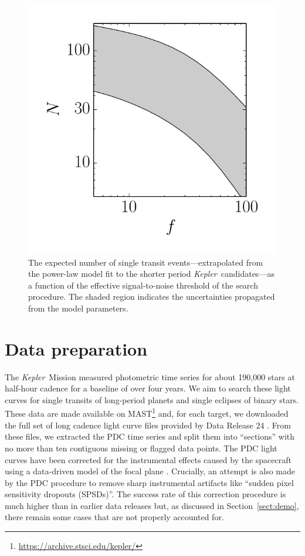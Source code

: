 \documentclass[12pt,preprint]{aastex}
\newcommand{\project}[1]{\textsl{#1}}
\newcommand{\kepler}{\project{Kepler}}
\newcommand{\figlabel}[1]{\label{fig:#1}}
\newcommand{\sectionname}{Section}
\newcommand{\sectref}[1]{\ref{sect:#1}}
\newcommand{\Sect}[1]{\sectionname~\sectref{#1}}
\newcommand{\sect}[1]{\Sect{#1}}
\newcommand{\sectlabel}[1]{\label{sect:#1}}
\begin{document}
\begin{figure}[p]
\begin{center}
\includegraphics{figures/predict.pdf}
\end{center}
\caption{%
The expected number of single transit events---extrapolated from the
\citet{Dong:2013} power-law model fit to the shorter period \kepler\
candidates---as a function of the effective signal-to-noise threshold of the
search procedure.
The shaded region indicates the uncertainties propagated from the model
parameters.
\figlabel{predict}}
\end{figure}


\section{Data preparation}\sectlabel{data}

The \kepler\ Mission measured photometric time series for about 190,000 stars
at half-hour cadence for a baseline of over four years.
We aim to search these light curves for single transits of long-period planets
and single eclipses of binary stars.
These data are made available on
MAST\footnote{\url{https://archive.stsci.edu/kepler/}} and, for each target,
we downloaded the full set of long cadence light curve files provided by Data
Release 24 \citep{Thompson:2015}.
From these files, we extracted the PDC time series and split them into
``sections'' with no more than ten contiguous missing or flagged data points.
The PDC light curves have been corrected for the instrumental effects caused
by the spacecraft using a data-driven model of the focal plane
\citep{Stumpe:2012, Smith:2012}.
Crucially, an attempt is also made by the PDC procedure to remove sharp
instrumental artifacts like ``sudden pixel sensitivity dropouts (SPSDs)''.
The success rate of this correction procedure is much higher than in earlier
data releases but, as discussed in \sect{demo}, there remain some cases that
are not properly accounted for.
\end{document}
